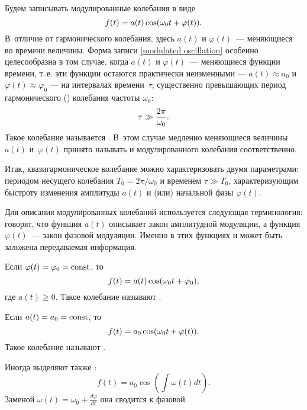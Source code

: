 Будем записывать модулированные колебания в виде
\begin{equation}
    \eqmark{modulated oscillation}
    f(t)=a(t)\cos(\omega_0t+\varphi(t)).
\end{equation}
В~отличие от гармонического колебания, здесь $a(t)$ и $\varphi(t)$~---
меняющиеся во времени величины. Форма записи \eqref{modulated oscillation}
особенно целесообразна в том случае, когда $a(t)$ и $\varphi(t)$~---
 меняющиеся функции времени, т.\,е.
эти функции остаются практически неизменными --- $a(t)\approx a_{0}$ и
$\varphi(t)\approx\varphi_0$ --- на интервалах времени~$\tau$,
существенно превышающих период гармонического ()
колебания частоты $\omega_0$:
\begin{equation}
    \eqmark{quasiharmonic oscillation - tau}
    \tau \gg \frac{2\pi}{\omega_0}.
\end{equation}
Такое колебание называется .
В~этом случае медленно меняющиеся величины~$a(t)$ и~$\varphi(t)$
принято называть  и  модулированного колебания
соответственно.

Итак, квазигармоническое колебание можно характеризовать двумя параметрами:
периодом несущего колебания $T_0=2\pi/\omega_0$ и временем $\tau \gg T_0$,
характеризующим быстроту изменения амплитуды $a(t)$ и (или) начальной
фазы $\varphi(t)$.

Для описания модулированных колебаний используется
следующая терминология: говорят, что функция $a(t)$ описывает закон амплитудной
модуляции, а функция $\varphi(t)$~--- закон
фазовой модуляции. Именно в этих функциях и может быть заложена
передаваемая информация.

Если $\varphi(t)=\varphi_0=\mathrm{const}$, то
\begin{equation}
    \eqmark{amplitude-modulated}
    f(t)=a(t)\cos(\omega_0t+\varphi_0),
\end{equation}
где $a(t)\ge0$. Такое колебание называют
.

Если $a(t)=a_0=\mathrm{const}$, то
\begin{equation}
    \eqmark{phase-modulated}
    f(t)=a_0 \cos(\omega_0t+\varphi(t)).
\end{equation}
Такое колебание называют .
\begin{lab:note}
Иногда выделяют также :
    \begin{equation*}
     f(t)=a_0 \cos\left(\int\omega(t) dt\right).
    \end{equation*}
Заменой $\omega(t) = \omega_0 + \frac{d\varphi}{dt}$ она сводится
к фазовой.
\end{lab:note}

